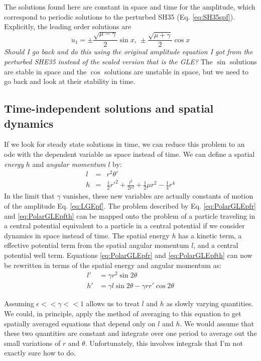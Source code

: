 \documentclass[api,pof,pre,12pt,a4paper]{revtex4-1}
\newcommand{\beqn}{\begin{equation}}
\newcommand{\eeqn}{\end{equation}}
\begin{document}
The solutions found here are constant in space and time for the amplitude, which correspond to periodic solutions to the perturbed SH35 (Eq. \ref{eq:SH35spf}). Explicitly, the leading order solutions are 
\beqn
u_1=\pm \frac{\sqrt{\mu-\gamma}}{2} \sin x,\: \pm \frac{\sqrt{\mu+\gamma}}{2} \cos x
\eeqn
{\it Should I go back and do this using the original amplitude equation I got from the perturbed SHE35 instead of the scaled version that is the GLE?}
The $\sin$ solutions are stable in space and the $\cos$ solutions are unstable in space, but we need to go back and look at their stability in time.



\subsection{Time-independent solutions and spatial dynamics}
If we look for steady state solutions in time, we can reduce this problem to an ode with the dependent variable as space instead of time.  We can define a spatial {\it energy} $h$ and {\it angular momentum} $l$ by:
\begin{eqnarray}
l &=& r^2\theta' \\
h &=& \frac{1}{2} r'^2 +\frac{l^2}{2r^2} +\frac{1}{2}\mu r^2 -\frac{1}{4} r^4
\end{eqnarray}
In the limit that $\gamma$ vanishes, these new variables are actually constants of motion of the amplitude Eq. \ref{eq:LGEpf}.  The problem described by Eq. \eqref{eq:PolarGLEpfr} and \eqref{eq:PolarGLEpfth} can be mapped onto the problem of a particle traveling in a central potential equivalent to a particle in a central potential if we consider dynamics in space instead of time.  The spatial energy $h$ has a kinetic term, a effective potential term from the spatial angular momentum $l$, and a central potential well term.  Equations \eqref{eq:PolarGLEpfr} and \eqref{eq:PolarGLEpfth} can now be rewritten in terms of the spatial energy and angular momentum as:
\begin{subequations}
\begin{align}
l' &= \gamma r^2 \sin 2\theta 
\label{eq:CentPotL} \\
h'&= \gamma l \sin 2\theta-\gamma r r' \cos 2\theta
\label{eq:CentPotH}
\end{align}
\end{subequations}

Assuming $\epsilon <<\gamma <<1$ allows us to treat $l$ and $h$ as slowly varying quantities.  We could, in principle, apply the method of averaging to this equation to get spatially averaged equations that depend only on $l$ and $h$.  We would assume that these two quantities are constant and integrate over one period to average out the small variations of $r$ and $\theta$.  Unfortunately, this involves integrals that I'm not exactly sure how to do.
\end{document}
